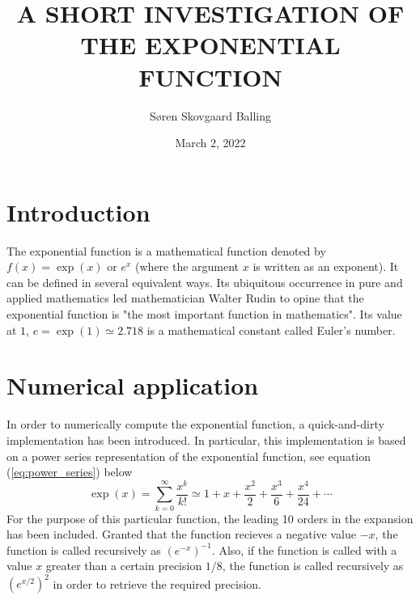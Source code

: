 \documentclass[11pt, twocolumn]{article}
\title{\renewcommand{\baselinestretch}{1.17}\bf%
\uppercase{A short investigation of the exponential function}
}
\author{Søren Skovgaard Balling}
\begin{document}
\date{March 2, 2022}

\maketitle

\section{Introduction}
The exponential function is a mathematical function denoted by $f(x)=\exp(x)$ or $e^{x}$ (where the argument $x$ is written as an exponent). It can be defined in several equivalent ways. Its ubiquitous occurrence in pure and applied mathematics led mathematician Walter Rudin to opine that the exponential function is "the most important function in mathematics". Its value at $1$, $e=\exp(1)\simeq 2.718$ is a mathematical constant called Euler's number.
\section{Numerical application}
In order to numerically compute the exponential function, a quick-and-dirty implementation has been introduced. In particular, this implementation is based on a power series representation of the exponential function, see equation (\ref{eq:power_series}) below
\begin{equation} \label{eq:power_series}
\exp(x) = \sum_{k = 0}^{\infty} \frac{x^k}{k!} \simeq 1 + x + \frac{x^2}{2} + \frac{x^3}{6} + \frac{x^4}{24} + \cdots
\end{equation}
For the purpose of this particular function, the leading 10 orders in the expansion has been included. Granted that the function recieves a negative value $-x$, the function is called recursively as $(e^{-x})^{-1}$. Also, if the function is called with a value $x$ greater than a certain precision $1/8$, the function is called recursively as $(e^{x/2})^{2}$ in order to retrieve the required precision. 
\end{document}
